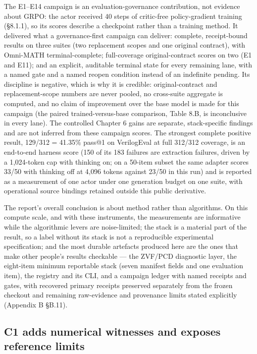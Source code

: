 \documentclass[12pt,a4paper]{report}
\begin{document}
The E1--E14 campaign is an evaluation-governance contribution, not
evidence about GRPO: the actor received 40 steps of critic-free
policy-gradient training (§8.1.1), so its scores describe a checkpoint
rather than a training method. It delivered what a governance-first
campaign can deliver: complete, receipt-bound results on three suites
(two replacement scopes and one original contract), with Omni-MATH
terminal-complete; full-coverage original-contract scores on two (E1 and
E11); and an explicit, auditable terminal state for every remaining
lane, with a named gate and a named reopen condition instead of an
indefinite pending. Its discipline is negative, which is why it is
credible: original-contract and replacement-scope numbers are never
pooled, no cross-suite aggregate is computed, and no claim of
improvement over the base model is made for this campaign (the paired
trained-versus-base comparison, Table 8.B, is inconclusive in every
lane). The controlled Chapter 6 gains are separate, stack-specific
findings and are not inferred from these campaign scores. The strongest
complete positive result, 129/312 = 41.35\% pass@1 on VerilogEval at
full 312/312 coverage, is an end-to-end harness score (150 of its 183
failures are extraction failures, driven by a 1,024-token cap with
thinking on; on a 50-item subset the same adapter scores 33/50 with
thinking off at 4,096 tokens against 23/50 in this run) and is reported
as a measurement of one actor under one generation budget on one suite,
with operational source bindings retained outside this public
derivative.

The report's overall conclusion is about method rather than algorithms.
On this compute scale, and with these instruments, the measurements are
informative while the algorithmic levers are noise-limited; the stack is
a material part of the result, so a label without its stack is not a
reproducible experimental specification; and the most durable artefacts
produced here are the ones that make other people's results checkable
--- the ZVF/PCD diagnostic layer, the eight-item minimum reportable
stack (seven manifest fields and one evaluation item), the registry and
its CLI, and a campaign ledger with named receipts and gates, with
recovered primary receipts preserved separately from the frozen checkout
and remaining raw-evidence and provenance limits stated explicitly
(Appendix B §B.11).

\subsection{C1 adds numerical witnesses and exposes reference
limits}\label{c1-adds-numerical-witnesses-and-exposes-reference-limits}
\end{document}
